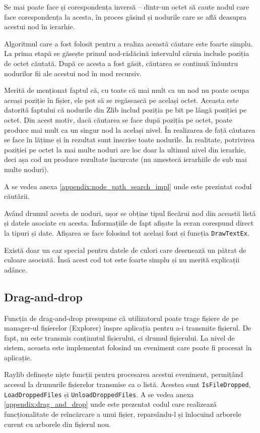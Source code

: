 \documentclass[a4paper,12pt]{report}
\begin{document}
Se mai poate face și corespondența inversă -- dintr-un octet să caute nodul care face corespondența la acesta,
în proces găsind și nodurile care se află deasupra acestui nod în ierarhie.

Algoritmul care a fost folosit pentru a realiza această căutare este foarte simplu.
La prima etapă se găsește primul nod-rădăcină intervalul căruia include poziția de octet căutată.
După ce acesta a fost găsit, căutarea se continuă înăuntru nodurilor fii ale acestui nod în mod recursiv.

Merită de menționat faptul că, cu toate că mai mult ca un nod nu poate ocupa aceași poziție în fișier,
ele pot să se regăsească pe același octet.
Aceasta este datorită faptului că nodurile din Zlib includ poziția pe bit pe lângă poziției pe octet.
Din acest motiv, dacă căutarea se face după poziția pe octet,
poate produce mai mult ca un singur nod la același nivel.
În realizarea de față căutarea se face în lățime și în rezultat sunt înscrise toate nodurile.
În realitate, potrivirea poziției pe octet la mai multe noduri are loc doar la ultimul nivel din ierarhie,
deci așa cod nu produce rezultate încurcate (nu amestecă ierarhiile de sub mai multe noduri).

A se vedea anexa \ref{appendix:node_path_search_impl} unde este prezintat codul căutării.

Având drumul acesta de noduri, ușor se obține tipul fiecărui
nod din această listă și datele asociate cu acesta.
Informațiile de fapt afișate la ecran corespund direct la tipuri și date.
Afișarea se face folosind tot același font și funcția \texttt{DrawTextEx}.

Există doar un caz special pentru datele de culori care desenează un pătrat de culoare asociată.
Însă acest cod tot este foarte simplu și nu merită explicații adânce.

\subsection{Drag-and-drop}

Funcția de drag-and-drop presupune că utilizatorul poate trage fișiere
de pe manager-ul fișierelor (Explorer) înspre aplicația pentru a-i transmite fișierul.
De fapt, nu este transmis conținutul fișierului, ci drumul fișierului.
La nivel de sistem, aceasta este implementat folosind un eveniment care poate fi procesat în aplicație.

Raylib definește niște funcții pentru procesarea acestui eveniment,
permițând accesul la drumurile fișierelor transmise ca o listă.
Acestea sunt \texttt{IsFileDropped}, \texttt{LoadDroppedFiles} și \texttt{UnloadDroppedFiles}.
A se vedea anexa \ref{appendix:drag_and_drop} unde este prezentat codul
care realizează funcționalitate de reîncărcare a unui fișier, reparsându-l
și înlocuind arborele curent cu arborele din fișierul nou.
\end{document}
